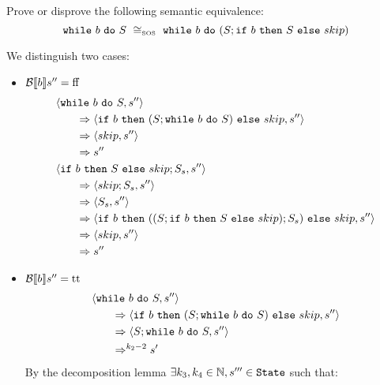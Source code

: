 \begin{exercise}{
    Prove or disprove the following semantic equivalence:
    \[ \wwhile{b}{S}\ \SOScong\ \wwhile{b}{(S;\wif{b}{S}{skip})} \]
}
\begin{itemize}
\begin{itemize}
\begin{itemize}
\[                            \]
                            We distinguish two cases:
                            \begin{itemize}
                                \item $\mathcal{B} \llbracket b \rrbracket s'' = \text{ff}$
                                    \begin{align*}
                                        &\left<\texttt{while}\ b\ \texttt{do}\ S, s''\right>
                                        \\&\qquad\Rightarrow \left<\texttt{if}\ b\ \texttt{then}\ (S; \texttt{while}\ b\ \texttt{do}\ S)\ \texttt{else}\ skip, s''\right>
                                        \\&\qquad\Rightarrow \left<skip, s''\right>
                                        \\&\qquad\Rightarrow s''
                                        \\
                                        &\left<\texttt{if}\ b\ \texttt{then}\ S\ \texttt{else}\ skip;S_s, s''\right>
                                        \\&\qquad\Rightarrow \left<skip;S_s, s''\right>
                                        \\&\qquad\Rightarrow \left<S_s, s''\right>
                                        \\&\qquad\Rightarrow \left<\texttt{if}\ b\ \texttt{then}\ ((S;\texttt{if}\ b\ \texttt{then}\ S\ \texttt{else}\ skip);S_s)\ \texttt{else}\ skip, s''\right>
                                        \\&\qquad\Rightarrow \left<skip, s''\right>
                                        \\&\qquad\Rightarrow s''
                                    \end{align*}
                                \item $\mathcal{B} \llbracket b \rrbracket s'' = \text{tt}$
                                    \begin{align*}
                                        &\left<\texttt{while}\ b\ \texttt{do}\ S, s''\right>
                                        \\&\qquad\Rightarrow \left<\texttt{if}\ b\ \texttt{then}\ (S; \texttt{while}\ b\ \texttt{do}\ S)\ \texttt{else}\ skip, s''\right>
                                        \\&\qquad\Rightarrow \left<S; \texttt{while}\ b\ \texttt{do}\ S, s''\right>
                                        \\&\qquad\Rightarrow^{k_2 - 2} s'
                                    \end{align*}
                                    By the decomposition lemma $\exists k_3, k_4 \in \mathbb{N}, s''' \in \texttt{State}$ such that:
                                    \begin{gather*}

\end{gather*}
\end{itemize}
\end{itemize}
\end{itemize}
\end{itemize}
\end{exercise}

